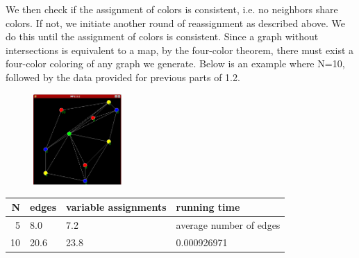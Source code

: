 We then check if the assignment of colors is consistent, i.e. no neighbors share colors. If not, we initiate another round of reassignment as described above. We do this until the assignment of colors is consistent. Since a graph without intersections is equivalent to a map, by the four-color theorem, there must exist a four-color coloring of any graph we generate. Below is an example where N=10, followed by the data provided for previous parts of 1.2.

\begin{figure}[H]
  \centering
  \includegraphics[width=0.3\textwidth]{graphics/local_assign_10.png}
\end{figure}

\begin{tabular}{r|l|l|l}
  N & edges & variable assignments & running time \\
  \hline
  5 & 8.0 & 7.2 & average number of edges \\
  10 & 20.6 & 23.8 & 0.000926971 \\
\end{tabular}
